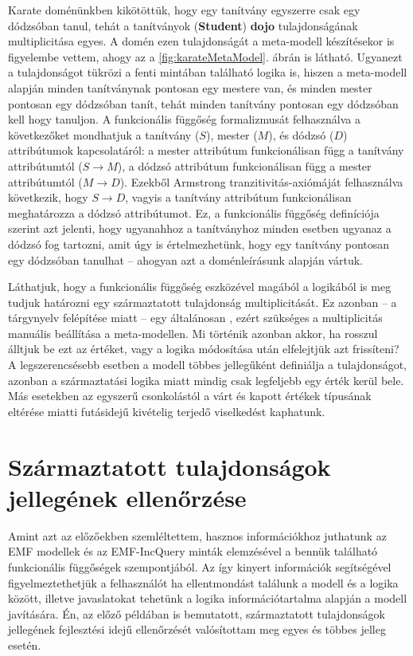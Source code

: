 Karate doménünkben kikötöttük, hogy egy tanítvány egyszerre csak egy dódzsóban tanul, tehát a tanítványok (\textbf{Student}) \textbf{dojo} tulajdonságának multiplicitása egyes.
A domén ezen tulajdonságát a meta-modell készítésekor is figyelembe vettem, ahogy az a \ref{fig:karateMetaModel}. ábrán is látható.
Ugyanezt a tulajdonságot tükrözi a fenti mintában található logika is, hiszen a meta-modell alapján minden tanítványnak pontosan egy mestere van, és minden mester pontosan egy dódzsóban tanít, tehát minden tanítvány pontosan egy dódzsóban kell hogy tanuljon.
A funkcionális függőség formalizmusát felhasználva a következőket mondhatjuk a tanítvány ($S$), mester ($M$), és dódzsó ($D$) attribútumok kapcsolatáról: a mester attribútum funkcionálisan függ a tanítvány attribútumtól ($S \rightarrow M$), a dódzsó attribútum funkcionálisan függ a mester attribútumtól ($M \rightarrow D$).
Ezekből Armstrong tranzitivitás-axiómáját felhasználva következik, hogy $S \rightarrow D$, vagyis a tanítvány attribútum funkcionálisan meghatározza a dódzsó attribútumot.
Ez, a funkcionális függőség definíciója szerint azt jelenti, hogy ugyanahhoz a tanítványhoz minden esetben ugyanaz a dódzsó fog tartozni, amit úgy is értelmezhetünk, hogy egy tanítvány pontosan egy dódzsóban tanulhat -- ahogyan azt a doménleírásunk alapján vártuk.

Láthatjuk, hogy a funkcionális függőség eszközével magából a logikából is meg tudjuk határozni egy származtatott tulajdonság multiplicitását.
Ez azonban -- a tárgynyelv felépítése miatt -- egy általánosan , ezért szükséges a multiplicitás manuális beállítása a meta-modellen.
Mi történik azonban akkor, ha rosszul álltjuk be ezt az értéket, vagy a logika módosítása után elfelejtjük azt frissíteni?
A legszerencsésebb esetben a modell többes jellegűként definiálja a tulajdonságot, azonban a származtatási logika miatt mindig csak legfeljebb egy érték kerül bele. Más esetekben az egyszerű csonkolástól a várt és kapott értékek típusának eltérése miatti futásidejű kivételig terjedő viselkedést kaphatunk.

\section{Származtatott tulajdonságok jellegének ellenőrzése}

Amint azt az előzőekben szemléltettem, hasznos információkhoz juthatunk az \gls{EMF} modellek és az EMF-IncQuery minták elemzésével a bennük található funkcionális függőségek szempontjából.
Az így kinyert információk segítségével figyelmeztethetjük a felhasználót ha ellentmondást találunk a modell és a logika között, illetve javaslatokat tehetünk a logika információtartalma alapján a modell javítására.
Én, az előző példában is bemutatott, származtatott tulajdonságok jellegének fejlesztési idejű ellenőrzését valósítottam meg egyes és többes jelleg esetén.

